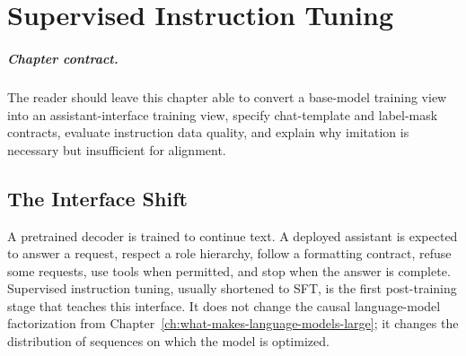 \chapter{Supervised Instruction Tuning}
\label{ch:supervised-instruction-tuning}


\paragraph{Chapter contract.} The reader should leave this chapter able to convert a base-model training view into an assistant-interface training view, specify chat-template and label-mask contracts, evaluate instruction data quality, and explain why imitation is necessary but insufficient for alignment.

\section{The Interface Shift}
\label{sec:sft-interface-shift}

A pretrained decoder is trained to continue text. A deployed assistant is expected to answer a request, respect a role hierarchy, follow a formatting contract, refuse some requests, use tools when permitted, and stop when the answer is complete. Supervised instruction tuning, usually shortened to SFT, is the first post-training stage that teaches this interface. It does not change the causal language-model factorization from Chapter~\ref{ch:what-makes-language-models-large}; it changes the distribution of sequences on which the model is optimized.

